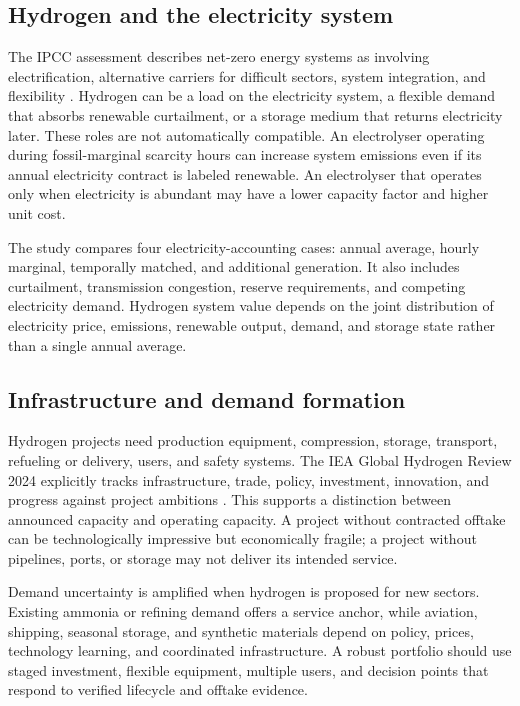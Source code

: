 \documentclass[conference]{IEEEtran}
\begin{document}
\subsection{Hydrogen and the electricity system}
The IPCC assessment describes net-zero energy systems as involving electrification, alternative carriers for difficult sectors, system integration, and flexibility \cite{ipcc_wg3}. Hydrogen can be a load on the electricity system, a flexible demand that absorbs renewable curtailment, or a storage medium that returns electricity later. These roles are not automatically compatible. An electrolyser operating during fossil-marginal scarcity hours can increase system emissions even if its annual electricity contract is labeled renewable. An electrolyser that operates only when electricity is abundant may have a lower capacity factor and higher unit cost.

The study compares four electricity-accounting cases: annual average, hourly marginal, temporally matched, and additional generation. It also includes curtailment, transmission congestion, reserve requirements, and competing electricity demand. Hydrogen system value depends on the joint distribution of electricity price, emissions, renewable output, demand, and storage state rather than a single annual average.

\subsection{Infrastructure and demand formation}
Hydrogen projects need production equipment, compression, storage, transport, refueling or delivery, users, and safety systems. The IEA Global Hydrogen Review 2024 explicitly tracks infrastructure, trade, policy, investment, innovation, and progress against project ambitions \cite{iea_review}. This supports a distinction between announced capacity and operating capacity. A project without contracted offtake can be technologically impressive but economically fragile; a project without pipelines, ports, or storage may not deliver its intended service.

Demand uncertainty is amplified when hydrogen is proposed for new sectors. Existing ammonia or refining demand offers a service anchor, while aviation, shipping, seasonal storage, and synthetic materials depend on policy, prices, technology learning, and coordinated infrastructure. A robust portfolio should use staged investment, flexible equipment, multiple users, and decision points that respond to verified lifecycle and offtake evidence.
\end{document}
